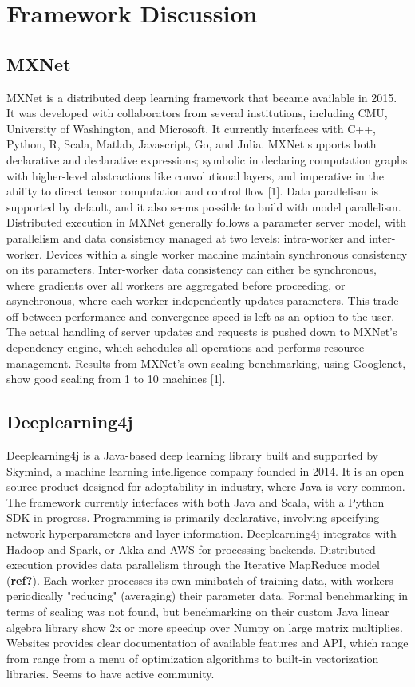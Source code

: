 \documentclass{article}
\begin{document}
\section{Framework Discussion}
\subsection{MXNet}
MXNet is a distributed deep learning framework that became available in 2015. It was developed with collaborators from several institutions, including CMU, University of Washington, and Microsoft. It currently interfaces with C++, Python, R, Scala, Matlab, Javascript, Go, and Julia. MXNet supports both declarative and declarative expressions; symbolic in declaring computation graphs with higher-level abstractions like convolutional layers, and imperative in the ability to direct tensor computation and control flow [1]. Data parallelism is supported by default, and it also seems possible to build with model parallelism. Distributed execution in MXNet generally follows a parameter server model, with parallelism and data consistency managed at two levels: intra-worker and inter-worker. Devices within a single worker machine maintain synchronous consistency on its parameters. Inter-worker data consistency can either be synchronous, where gradients over all workers are aggregated before proceeding, or asynchronous, where each worker independently updates parameters. This trade-off between performance and convergence speed is left as an option to the user. The actual handling of server updates and requests is pushed down to MXNet's dependency engine, which schedules all operations and performs resource management. Results from MXNet's own scaling benchmarking, using Googlenet, show good scaling from 1 to 10 machines [1]. 

\subsection{Deeplearning4j}
Deeplearning4j is a Java-based deep learning library built and supported by Skymind, a machine learning intelligence company founded in 2014. It is an open source product designed for adoptability in industry, where Java is very common. The framework currently interfaces with both Java and Scala, with a Python SDK in-progress. Programming is primarily declarative, involving specifying network hyperparameters and layer information. Deeplearning4j integrates with Hadoop and Spark, or Akka and AWS for processing backends. Distributed execution provides data parallelism through the Iterative MapReduce model (\textbf{ref?}). Each worker processes its own minibatch of training data, with workers periodically "reducing" (averaging) their parameter data. Formal benchmarking in terms of scaling was not found, but benchmarking on their custom Java linear algebra library show 2x or more speedup over Numpy on large matrix multiplies. Websites provides clear documentation of available features and API, which range from range from a menu of optimization algorithms to built-in vectorization libraries. Seems to have active community. 
\end{document}
